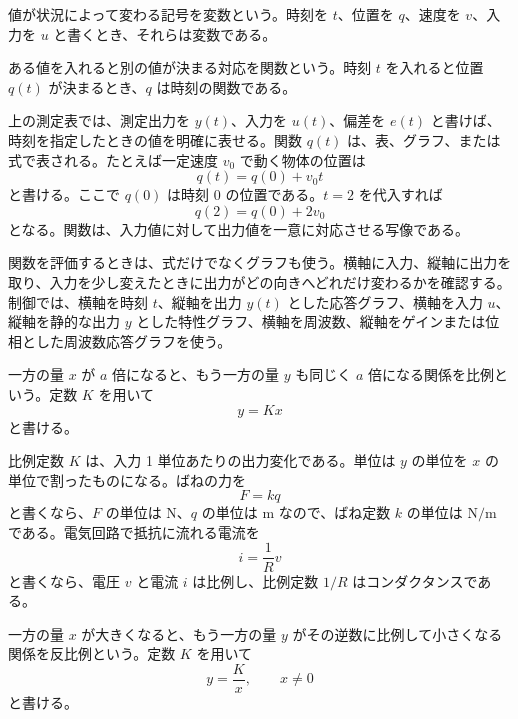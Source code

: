 \begin{definition}[変数]
値が状況によって変わる記号を変数という。時刻を $t$、位置を $q$、速度を $v$、入力を $u$ と書くとき、それらは変数である。
\end{definition}

\begin{definition}[関数]
ある値を入れると別の値が決まる対応を関数という。時刻 $t$ を入れると位置 $q(t)$ が決まるとき、$q$ は時刻の関数である。
\end{definition}

上の測定表では、測定出力を $y(t)$、入力を $u(t)$、偏差を $e(t)$ と書けば、時刻を指定したときの値を明確に表せる。関数 $q(t)$ は、表、グラフ、または式で表される。たとえば一定速度 $v_0$ で動く物体の位置は
\begin{equation}
  q(t)=q(0)+v_0t
\end{equation}
と書ける。ここで $q(0)$ は時刻 0 の位置である。$t=2$ を代入すれば
\begin{equation}
  q(2)=q(0)+2v_0
\end{equation}
となる。関数は、入力値に対して出力値を一意に対応させる写像である。

関数を評価するときは、式だけでなくグラフも使う。横軸に入力、縦軸に出力を取り、入力を少し変えたときに出力がどの向きへどれだけ変わるかを確認する。制御では、横軸を時刻 $t$、縦軸を出力 $y(t)$ とした応答グラフ、横軸を入力 $u$、縦軸を静的な出力 $y$ とした特性グラフ、横軸を周波数、縦軸をゲインまたは位相とした周波数応答グラフを使う。

\begin{definition}[比例]
一方の量 $x$ が $a$ 倍になると、もう一方の量 $y$ も同じく $a$ 倍になる関係を比例という。定数 $K$ を用いて
\begin{equation}
  y=Kx
\end{equation}
と書ける。
\end{definition}

比例定数 $K$ は、入力 1 単位あたりの出力変化である。単位は $y$ の単位を $x$ の単位で割ったものになる。ばねの力を
\begin{equation}
  F=kq
\end{equation}
と書くなら、$F$ の単位は N、$q$ の単位は m なので、ばね定数 $k$ の単位は $\mathrm{N/m}$ である。電気回路で抵抗に流れる電流を
\begin{equation}
  i=\frac{1}{R}v
\end{equation}
と書くなら、電圧 $v$ と電流 $i$ は比例し、比例定数 $1/R$ はコンダクタンスである。

\begin{definition}[反比例]
一方の量 $x$ が大きくなると、もう一方の量 $y$ がその逆数に比例して小さくなる関係を反比例という。定数 $K$ を用いて
\begin{equation}
  y=\frac{K}{x},\qquad x\ne0
\end{equation}
と書ける。
\end{definition}


